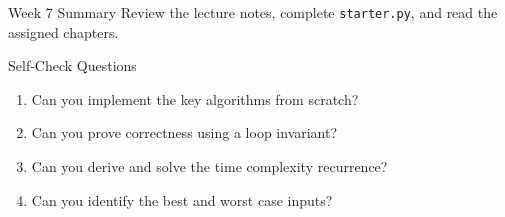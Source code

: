 \documentclass[aspectratio=169,xcolor=dvipsnames]{beamer}
\begin{document}
\begin{frame}{Week 7 Summary}
  Review the lecture notes, complete \texttt{starter.py}, and read the assigned chapters.\\[6pt]
  \begin{block}{Self-Check Questions}
    \begin{enumerate}
      \item Can you implement the key algorithms from scratch?
      \item Can you prove correctness using a loop invariant?
      \item Can you derive and solve the time complexity recurrence?
      \item Can you identify the best and worst case inputs?
    \end{enumerate}
  \end{block}
\end{frame}
\end{document}
